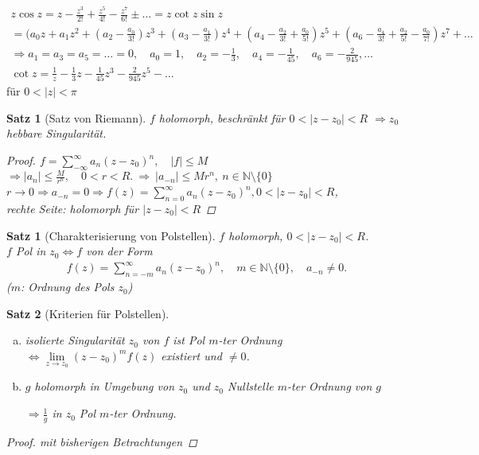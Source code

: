 \documentclass[ngerman,halfparskip]{scrartcl}
\newtheorem{satz}{Satz}[section]
\newtheorem*{satz*}{Satz}
\theoremstyle{definition}
\def\N{\mathbb N}
\begin{document}
\begin{gather*} z\cos z =z-\frac{z^3}{2!}+\frac{z^5}{4!}-\frac{z^7}{6!}\pm \ldots =z\cot z \sin z \\
=(a_0z+a_1 z^2 +(a_2-\frac{a_0}{3!})z^3+(a_3-\frac{a_1}{3!})z^4+(a_4-\frac{a_2}{3!}+\frac{a_0}{5!})z^5+ (a_6-\frac{a_4}{3!}+\frac{a_2}{5!}-\frac{a_0}{7!})z^7+\ldots\\
\Rightarrow a_1=a_3=a_5=\ldots =0, \quad a_0=1,\quad a_2=-\frac 13, \quad a_4=-\frac 1{45},\quad a_6=-\frac 2{945}, \ldots\\
\cot z=\frac 1z-\frac 13z-\frac 1{45}z^3-\frac 2{945}z^5-\ldots
\end{gather*}
für $0<|z|<\pi$

\begin{satz*}[Satz von Riemann]
$f$ holomorph, beschränkt für $0<|z-z_0|<R$
$\Rightarrow z_0$ hebbare Singularität.
\begin{proof}
$f=\sum\limits_{-\infty}^\infty a_n(z-z_0)^n, \quad |f|\leq M$\\ 
$\Rightarrow |a_n|\leq \frac M{r^n}, \quad 0<r<R. ~\Rightarrow ~|a_{-n}|\leq Mr^n, ~n\in\N\setminus \{0\}$\\
$r\rightarrow 0 \Rightarrow a_{-n}=0 \Rightarrow f(z)=\sum_{n=0}^\infty a_n(z-z_0)^n, 0<|z-z_0|<R$,\\ rechte Seite: holomorph für $|z-z_0|<R$
\end{proof}
\end{satz*}

\begin{satz}[Charakterisierung von Polstellen]
$f$ holomorph, $0<|z-z_0|<R$. \\
$f$ Pol in $z_0 \Leftrightarrow f$ von der Form
\begin{gather*}
f(z)=\sum\limits_{n=-m}^\infty a_n(z-z_0)^n, \quad m\in\N\setminus\{0\}, \quad a_{-n}\neq 0.
\end{gather*}
($m$: Ordnung des Pols $z_0$)
\end{satz}

\begin{satz*}[Kriterien für Polstellen]~

\begin{enumerate}[a)]
\item isolierte Singularität $z_0$ von $f$ ist Pol $m$-ter Ordnung $\Leftrightarrow \lim\limits_{z\rightarrow z_0} (z-z_0)^mf(z)$ existiert und $\neq 0$.
\item $g$ holomorph in Umgebung von $z_0$ und $z_0$ Nullstelle $m$-ter Ordnung von $g$

$\Rightarrow \frac 1g$ in $z_0$ Pol $m$-ter Ordnung.

\end{enumerate}
\begin{proof}
mit bisherigen Betrachtungen
\end{proof}
\end{satz*}
\end{document}
